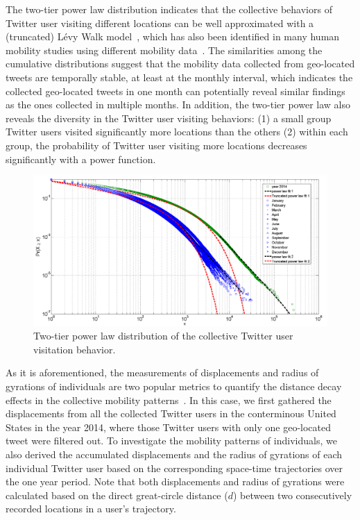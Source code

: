\documentclass[ijgi,article,accept,moreauthors,pdftex,10pt,a4paper]{mdpi}
\theoremstyle{mdpi}
\newcounter{ex}
\newcounter{re}
\theoremstyle{mdpidefinition}
\begin{document}
The two-tier power law distribution indicates that the collective behaviors of Twitter user visiting different locations can be well approximated with a (truncated) L\'{e}vy Walk model~\cite{ reynolds2012truncated, rhee2011levy}, which has also been identified in many human mobility studies using different mobility data~\cite{zhao2015explaining}.
The similarities among the cumulative distributions suggest that the mobility data collected from geo-located tweets are temporally stable, at least at the monthly interval, which indicates the collected geo-located tweets in one month can potentially reveal similar findings as the ones collected in multiple months.
In addition, the two-tier power law also reveals the diversity in the Twitter user visiting behaviors: (1) a small group Twitter users visited significantly more locations than the others (2) within each group, the probability of Twitter user visiting more locations decreases significantly with a power function.

\begin{figure}[ht]
\centering
\includegraphics[width=1.0\linewidth]{./figures/visitation}
\caption{Two-tier power law distribution of the collective Twitter user visitation behavior.}
\label{fig:visitation}
\end{figure}
\FloatBarrier

As it is aforementioned, the measurements of displacements and radius of gyrations of individuals are two popular metrics to quantify the distance decay effects in the collective mobility patterns~\cite{gonzalez2008understanding}.
In this case, we first gathered the displacements from all the collected Twitter users in the conterminous United States in the year 2014, where those Twitter users with only one geo-located tweet were filtered out. 
To investigate the mobility patterns of individuals, we also derived the accumulated displacements and the radius of gyrations of each individual Twitter user based on the corresponding space-time trajectories over the one year period.
Note that both displacements and radius of gyrations were calculated based on the direct great-circle distance ($d$) between two consecutively recorded locations in a user's trajectory.
\end{document}
